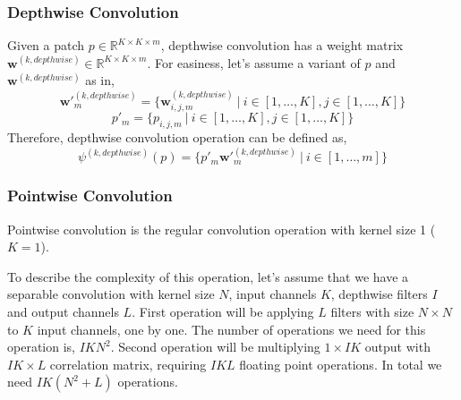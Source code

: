 \subsubsection{Depthwise Convolution}
Given a patch $p \in \mathbb{R}^{K \times K \times m}$, depthwise convolution has a weight matrix $\mathbf{w}^{(k, depthwise)} \in \mathbb{R}^{K \times K \times m}$. For easiness, let's assume a variant of $p$ and $\mathbf{w}^{(k, depthwise)}$ as in,
$$\mathbf{w}'^{(k, depthwise)}_m = \{ \mathbf{w}^{(k, depthwise)}_{i,j,m} \ | \ i \in [1, \ldots, K], j \in [1, \ldots, K] \}$$
$$p'_m = \{ p_{i,j,m} \ | \ i \in [1, \ldots, K], j \in [1, \ldots, K] \}$$
Therefore, depthwise convolution operation can be defined as, 
$$\psi^{(k, depthwise)}(p) = \{ p'_m\mathbf{w}'^{(k, depthwise)}_m \ | \ i \in [1, \ldots, m] \} $$
\subsubsection{Pointwise Convolution}
Pointwise convolution is the regular convolution operation with kernel size 1 ($K = 1$). 



To describe the complexity of this operation, let's assume that we have a separable convolution with kernel size $N$, input channels $K$, depthwise filters $I$ and output channels $L$. First operation will be applying $L$ filters with size $N \times N$ to $K$ input channels, one by one. The number of operations we need for this operation is, $IKN^2$. Second operation will be multiplying $1 \times IK$ output with $IK \times L$ correlation matrix, requiring $IKL$ floating point operations. In total we need $IK(N^2+L)$ operations. 



